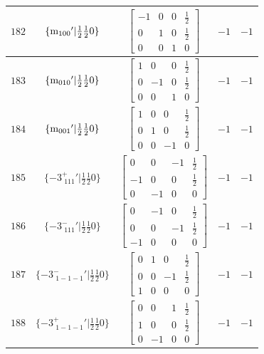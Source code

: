 \documentclass[fleqn,8pt]{jsarticle}
\begin{document}
\begin{longtable}{ccccc}
$ 182 $ & $ \{{\rm m}_{100}{}'|\frac{1}{2} \frac{1}{2} 0\} $ & $ \begin{bmatrix} -1 & 0 & 0 & \frac{1}{2} \\ 0 & 1 & 0 & \frac{1}{2} \\ 0 & 0 & 1 & 0 \end{bmatrix} $ & $ -1 $ & $ -1 $ \\ \hline
$ 183 $ & $ \{{\rm m}_{010}{}'|\frac{1}{2} \frac{1}{2} 0\} $ & $ \begin{bmatrix} 1 & 0 & 0 & \frac{1}{2} \\ 0 & -1 & 0 & \frac{1}{2} \\ 0 & 0 & 1 & 0 \end{bmatrix} $ & $ -1 $ & $ -1 $ \\ \hline
$ 184 $ & $ \{{\rm m}_{001}{}'|\frac{1}{2} \frac{1}{2} 0\} $ & $ \begin{bmatrix} 1 & 0 & 0 & \frac{1}{2} \\ 0 & 1 & 0 & \frac{1}{2} \\ 0 & 0 & -1 & 0 \end{bmatrix} $ & $ -1 $ & $ -1 $ \\ \hline
$ 185 $ & $ \{-3^{+}_{\,\,111}{}'|\frac{1}{2} \frac{1}{2} 0\} $ & $ \begin{bmatrix} 0 & 0 & -1 & \frac{1}{2} \\ -1 & 0 & 0 & \frac{1}{2} \\ 0 & -1 & 0 & 0 \end{bmatrix} $ & $ -1 $ & $ -1 $ \\ \hline
$ 186 $ & $ \{-3^{-}_{\,\,111}{}'|\frac{1}{2} \frac{1}{2} 0\} $ & $ \begin{bmatrix} 0 & -1 & 0 & \frac{1}{2} \\ 0 & 0 & -1 & \frac{1}{2} \\ -1 & 0 & 0 & 0 \end{bmatrix} $ & $ -1 $ & $ -1 $ \\ \hline
$ 187 $ & $ \{-3^{-}_{\,\,1-1-1}{}'|\frac{1}{2} \frac{1}{2} 0\} $ & $ \begin{bmatrix} 0 & 1 & 0 & \frac{1}{2} \\ 0 & 0 & -1 & \frac{1}{2} \\ 1 & 0 & 0 & 0 \end{bmatrix} $ & $ -1 $ & $ -1 $ \\ \hline
$ 188 $ & $ \{-3^{+}_{\,\,1-1-1}{}'|\frac{1}{2} \frac{1}{2} 0\} $ & $ \begin{bmatrix} 0 & 0 & 1 & \frac{1}{2} \\ 1 & 0 & 0 & \frac{1}{2} \\ 0 & -1 & 0 & 0 \end{bmatrix} $ & $ -1 $ & $ -1 $ \\ \hline

\end{longtable}
\end{document}
